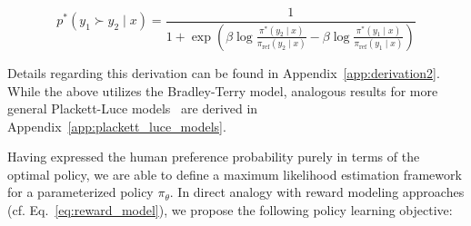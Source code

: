 \begin{equation}\label{eq:objective}
    p^*(y_1\succ y_2 \mid x)=\frac{1}{1 + \exp\left(\beta \log \frac{\pi^*(y_2\mid x)}{\pi_\text{ref}(y_2\mid x)} - \beta \log \frac{\pi^*(y_1\mid x)}{\pi_\text{ref}(y_1\mid x)}\right)}
\end{equation}

Details regarding this derivation can be found in Appendix~\ref{app:derivation2}. While the above utilizes the Bradley-Terry model, analogous results for more general Plackett-Luce models~\citep{plackett1975analysis, luce2012individual} are derived in Appendix~\ref{app:plackett_luce_models}.

Having expressed the human preference probability purely in terms of the optimal policy, we are able to define a maximum likelihood estimation framework for a parameterized policy $\pi_\theta$. In direct analogy with reward modeling approaches (cf. Eq.~\ref{eq:reward_model}), we propose the following policy learning objective:


